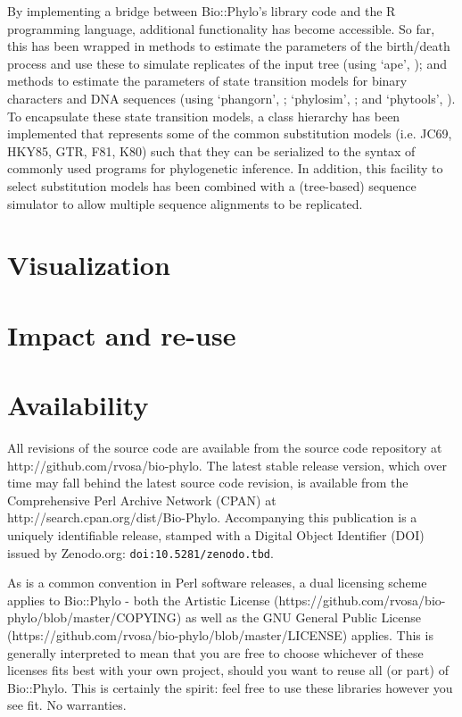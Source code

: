 \documentclass{bioinfo}
\begin{document}
By implementing a bridge between Bio::Phylo's library code and the R programming language,
additional functionality has become accessible. So far, this has been wrapped in methods
to estimate the parameters of the birth/death process and use these to simulate replicates
of the input tree (using `ape', \citet{Paradis2004}); and methods to estimate the 
parameters of state transition models for binary characters and DNA sequences (using
`phangorn', \cite{Schliep2010}; `phylosim', \citet{Sipos2011}; and `phytools', 
\citet{Revell2012}). To encapsulate these state transition models, a class hierarchy has
been implemented that represents some of the common substitution models (i.e. JC69,
HKY85, GTR, F81, K80) such that they can be serialized to the syntax of commonly used 
programs for phylogenetic inference. In addition, this facility to select substitution 
models has been combined with a (tree-based) sequence simulator to allow multiple sequence 
alignments to be replicated.

\section{Visualization}




\section{Impact and re-use}



\section{Availability}

All revisions of the source code are available from the source code repository at
http://github.com/rvosa/bio-phylo. The latest stable release version, which over time may
fall behind the latest source code revision, is available from the Comprehensive Perl 
Archive Network (CPAN) at http://search.cpan.org/dist/Bio-Phylo. Accompanying this 
publication is a uniquely identifiable release, stamped with a Digital Object Identifier 
(DOI) issued by Zenodo.org: \texttt{doi:10.5281/zenodo.tbd}.

As is a common convention in Perl software releases, a dual licensing scheme applies to
Bio::Phylo - both the Artistic License 
(https://github.com/rvosa/bio-phylo/blob/master/COPYING) as well as the GNU General Public 
License (https://github.com/rvosa/bio-phylo/blob/master/LICENSE) applies. This is 
generally interpreted to mean that you are free to choose whichever of these licenses fits 
best with your own project, should you want to reuse all (or part) of Bio::Phylo. This is 
certainly the spirit: feel free to use these libraries however you see fit. No warranties.
\end{document}

